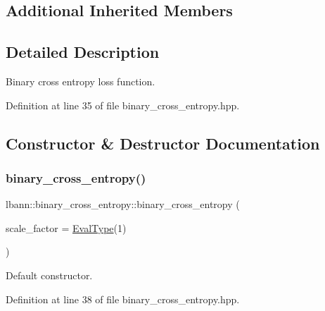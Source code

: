 \subsection*{Additional Inherited Members}


\subsection{Detailed Description}
Binary cross entropy loss function. 

Definition at line 35 of file binary\+\_\+cross\+\_\+entropy.\+hpp.



\subsection{Constructor \& Destructor Documentation}
\mbox{\label{classlbann_1_1binary__cross__entropy_ad142f09272d2572c34812dc6bbc54434}} 
\subsubsection{\texorpdfstring{binary\+\_\+cross\+\_\+entropy()}{binary\_cross\_entropy()}\hspace{0.1cm}{\footnotesize\ttfamily [1/2]}}
{\footnotesize\ttfamily lbann\+::binary\+\_\+cross\+\_\+entropy\+::binary\+\_\+cross\+\_\+entropy (\begin{DoxyParamCaption}\item[{\hyperlink{base_8hpp_a3266f5ac18504bbadea983c109566867}{Eval\+Type}}]{scale\+\_\+factor = {\ttfamily \hyperlink{base_8hpp_a3266f5ac18504bbadea983c109566867}{Eval\+Type}(1)} }\end{DoxyParamCaption})\hspace{0.3cm}{\ttfamily [inline]}}

Default constructor. 

Definition at line 38 of file binary\+\_\+cross\+\_\+entropy.\+hpp.



